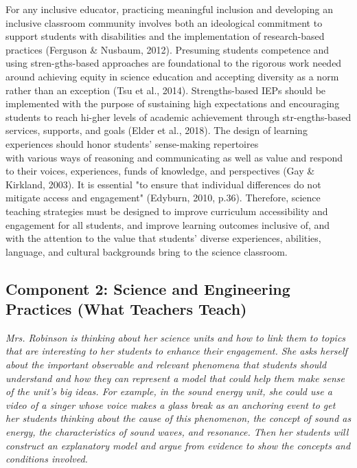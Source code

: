 \documentclass[11.5pt]{sig-alternate}
\begin{document}
\begin{large}
For any inclusive educator, practicing meaningful inclusion and developing an inclusive classroom community involves both an ideological commitment to support students with disabilities and the implementation of research-based practices (Ferguson \& Nusbaum, 2012). Presuming students competence and using stren-gths-based approaches are foundational to the rigorous work needed around achieving equity in science education and accepting diversity as a norm rather than an exception (Tsu et al., 2014). Strengths-based IEPs should be implemented with the purpose of sustaining high expectations and encouraging students to reach hi-gher levels of academic achievement through str-engths-based services, supports, and goals (Elder et al., 2018). The design of learning experiences should honor students’ sense-making repertoires \\with various ways of reasoning and communicating as well as value and respond to their voices, experiences, funds of knowledge, and perspectives (Gay \& Kirkland, 2003). It is essential "to ensure that individual differences do not mitigate access and engagement" (Edyburn, 2010, p.36). Therefore, science teaching strategies must be designed to improve curriculum accessibility and engagement for all students, and improve learning outcomes inclusive of, and with the attention to the value that students’ diverse experiences, abilities, language, and cultural backgrounds bring to the science classroom. 

\subsection*{Component 2: Science and Engineering Practices (What Teachers Teach)}

\textit{Mrs. Robinson is thinking about her science units and how to link them to topics that are interesting to her students to enhance their engagement. She asks herself about the important observable and relevant phenomena that students should understand and how they can represent a model that could help them make sense of the unit’s big ideas. For example, in the sound energy unit, she could use a video of a singer whose voice makes a glass break as an anchoring event to get her students thinking about the cause of this phenomenon, the concept of sound as energy, the characteristics of sound waves, and resonance. Then her students will construct an explanatory model and argue from evidence to show the concepts and conditions involved.}
	

\end{large}
\end{document}

